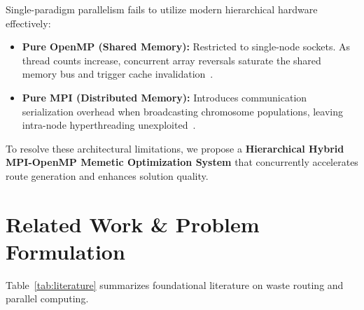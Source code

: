 \documentclass[runningheads]{llncs}
\begin{document}
Single-paradigm parallelism fails to utilize modern hierarchical hardware effectively:
\begin{itemize}
    \item \textbf{Pure OpenMP (Shared Memory):} Restricted to single-node sockets. As thread counts increase, concurrent array reversals saturate the shared memory bus and trigger cache invalidation~\cite{saxena2020optimized}.
    \item \textbf{Pure MPI (Distributed Memory):} Introduces communication serialization overhead when broadcasting chromosome populations, leaving intra-node hyperthreading unexploited~\cite{alba2013parallel}.
\end{itemize}

To resolve these architectural limitations, we propose a \textbf{Hierarchical Hybrid MPI-OpenMP Memetic Optimization System} that concurrently accelerates route generation and enhances solution quality.

\section{Related Work \& Problem Formulation}
Table~\ref{tab:literature} summarizes foundational literature on waste routing and parallel computing.
\end{document}
